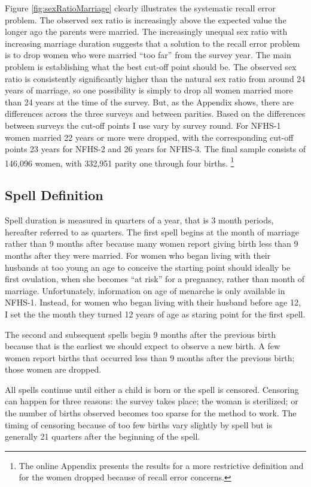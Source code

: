 \documentclass[12pt,letterpaper]{article}
\begin{document}
Figure \ref{fig:sexRatioMarriage} clearly illustrates the systematic recall error
problem.
The observed sex ratio is increasingly above the expected value the
longer ago the parents were married.
The increasingly unequal sex ratio with increasing marriage duration suggests that
a solution to the recall error problem is to drop women who were married ``too far'' from 
the survey year.
The main problem is establishing what the best cut-off point should be.
The observed sex ratio is consistently significantly higher than the natural sex ratio 
from around 24 years of marriage, so one possibility is simply to drop all women married 
more than 24 years at the time of the survey.
But, as the Appendix shows, there are differences across the three surveys and between 
parities.
Based on the differences between surveys the cut-off points I use vary by survey round.
For NFHS-1 women married 22 years or more were dropped, with the corresponding cut-off 
points 23 years for NFHS-2  and 26 years for NFHS-3.
The final sample consists of 146,096 women, with 332,951 parity one through four births.%
\footnote{
The online Appendix presents the results for a more restrictive definition and for the
women dropped because of recall error concerns.
}


\subsection{Spell Definition\label{sec:spell_def}}

Spell duration is measured in quarters of a year, that is 3 month periods, hereafter
referred to as quarters.
The first spell begins at the month of marriage rather than 9 months after because many 
women report giving birth less than 9 months after they were married.
For women who began living with their husbands at too young an age to conceive the 
starting point should ideally be first ovulation, when she becomes ``at risk'' for a 
pregnancy, rather than month of marriage.
Unfortunately, information on age of menarche is only available in NFHS-1.
Instead, for women who began living with their husband before age 12, I set the 
the month they turned 12 years of age as staring point for the first spell.

The second and subsequent spells begin 9 months after the previous birth 
because that is the earliest we should expect to observe a new birth.
A few women report births that occurred less than 9 months 
after the previous birth; those women are dropped.

All spells continue until either a child is born or the spell is censored.
Censoring can happen for three reasons:
the survey takes place;
the woman is sterilized;
or the number of births observed becomes too sparse for the method to work.
The timing of censoring because of too few births vary slightly by spell but is generally 
21 quarters after the beginning of the spell.
\end{document}
